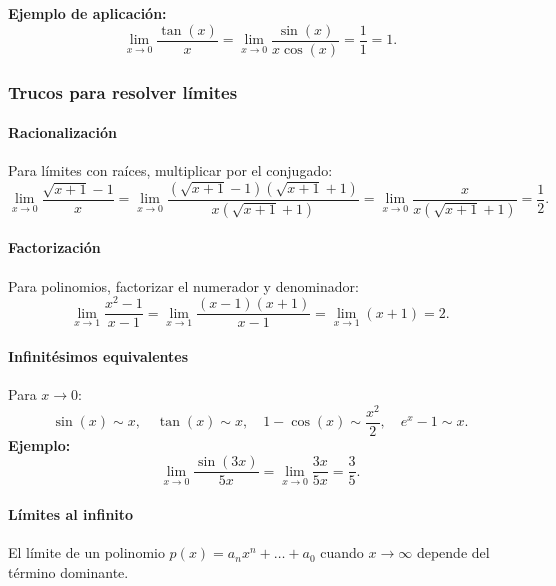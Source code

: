 \documentclass[12pt, a4paper]{article}
\theoremstyle{rioplatense}
\newtheorem{ejemplo}{Ejemplo}[section]
\begin{document}
\textbf{Ejemplo de aplicación:}
$$
\lim_{x \to 0} \frac{\tan(x)}{x} = \lim_{x \to 0} \frac{\sin(x)}{x \cos(x)} = \frac{1}{1} = 1.
$$

\subsubsection{Trucos para resolver límites}

\paragraph{Racionalización}
Para límites con raíces, multiplicar por el conjugado:
$$
\lim_{x \to 0} \frac{\sqrt{x + 1} - 1}{x} = \lim_{x \to 0} \frac{(\sqrt{x + 1} - 1)(\sqrt{x + 1} + 1)}{x (\sqrt{x + 1} + 1)} = \lim_{x \to 0} \frac{x}{x (\sqrt{x + 1} + 1)} = \frac{1}{2}.
$$

\paragraph{Factorización}
Para polinomios, factorizar el numerador y denominador:
$$
\lim_{x \to 1} \frac{x^2 - 1}{x - 1} = \lim_{x \to 1} \frac{(x - 1)(x + 1)}{x - 1} = \lim_{x \to 1} (x + 1) = 2.
$$

\paragraph{Infinitésimos equivalentes}
Para $ x \to 0 $:
$$
\sin(x) \sim x, \quad \tan(x) \sim x, \quad 1 - \cos(x) \sim \frac{x^2}{2}, \quad e^x - 1 \sim x.
$$
\textbf{Ejemplo:}
$$
\lim_{x \to 0} \frac{\sin(3x)}{5x} = \lim_{x \to 0} \frac{3x}{5x} = \frac{3}{5}.
$$

\paragraph{Límites al infinito}
%
El límite de un polinomio $ p(x) = a_nx^n + \dots + a_0 $ cuando $ x \to \infty $ depende del término dominante.

\end{document}
